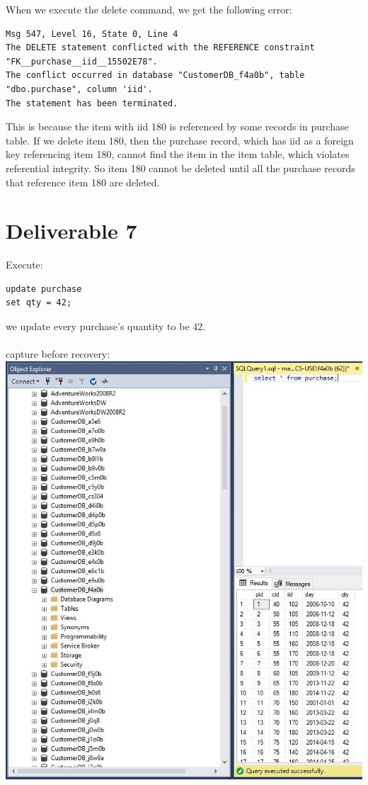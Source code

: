 \documentclass{article}
\begin{document}
\noindent When we execute the delete command, we get the following error: 
\begin{verbatim}
Msg 547, Level 16, State 0, Line 4
The DELETE statement conflicted with the REFERENCE constraint "FK__purchase__iid__15502E78". 
The conflict occurred in database "CustomerDB_f4a0b", table "dbo.purchase", column 'iid'.
The statement has been terminated.
\end{verbatim}

\noindent This is because the item with iid 180 is referenced by some records in purchase table. If we delete item 180, then the purchase record, which has iid as a foreign key referencing item 180, cannot find the item in the item table, which violates referential integrity. So item 180 cannot be deleted until all the purchase records that reference item 180 are deleted.

\section{Deliverable 7}

Execute:
\begin{verbatim}
update purchase
set qty = 42;
\end{verbatim}

\noindent we update every purchase's quantity to be 42.\\
\\
\noindent capture before recovery: \\
\includegraphics[scale=0.8]{capture_before_recovery}
\end{document}
